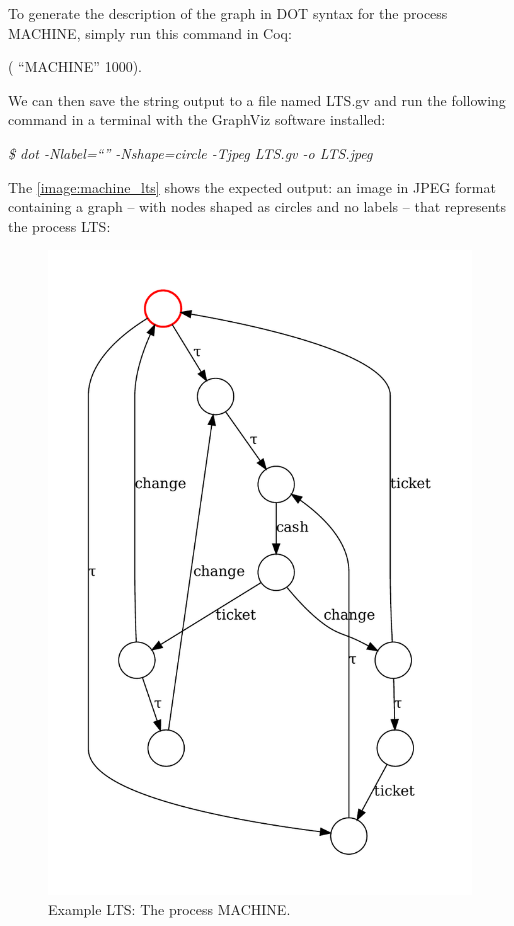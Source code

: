 To generate the description of the graph in DOT syntax for the process MACHINE, simply run this command in Coq:

\begin{coqdoccode}
	\coqdocnoindent
	  (  ``MACHINE'' 1000).\coqdoceol
\end{coqdoccode}

We can then save the string output to a file named LTS.gv and run the following command in a terminal with the GraphViz software installed:

\emph{\$ dot -Nlabel=``'' -Nshape=circle -Tjpeg LTS.gv -o LTS.jpeg}

The \autoref{image:machine_lts} shows the expected output: an image in JPEG format containing a graph -- with nodes shaped as circles and no labels -- that represents the process LTS:

\begin{figure}[htb]
	\caption[Example LTS: The process MACHINE]{Example LTS: The process MACHINE.}
	\label{image:machine_lts}
	\begin{center}
		\includegraphics[scale=0.75]{images/parking_permit_mch_lts.pdf}
	\end{center}
\end{figure}

